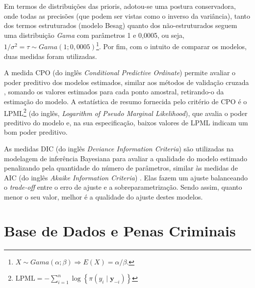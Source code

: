 \documentclass[12pt,openright,oneside,a4paper,english,french,spanish]{abntex2}
\numberwithin{table}{section} %
\numberwithin{figure}{section} %
\begin{document}
Em termos de distribuições das prioris, adotou-se uma postura conservadora, onde todas as precisões (que podem ser vistas como o inverso da variância), tanto dos termos estruturados (modelo Besag) quanto dos não-estruturados seguem uma distribuição \textit{Gama} com parâmetros 1 e 0,0005, ou seja, $1/\sigma ^{2}=\tau \sim Gama(1;0,0005)$\footnote{$X \sim Gama(\alpha;\beta) \Rightarrow E(X)=\alpha/\beta$.}. Por fim, com o intuito de comparar os modelos, duas medidas foram utilizadas.

A medida CPO (do inglês \textit{Conditional Predictive Ordinate}) \cite{spiegelhalter2002} permite avaliar o poder preditivo dos modelos estimados, similar aos métodos de validação cruzada \cite{kohavi1995}, somando os valores estimados para cada ponto amostral, retirando-o da estimação do modelo. A estatística de resumo fornecida pelo critério de CPO é o LPML\footnote{$\mbox{LPML}=-\sum_{i=1}^{n}\log\left\{ \pi\left(y_{i}\mid\boldsymbol{y}_{-i}\right)\right\}$} (do inglês, \textit{Logarithm of Pseudo Marginal Likelihood}), que avalia o poder preditivo do modelo e, na sua especificação, baixos valores de LPML indicam um bom poder preditivo.

As medidas DIC (do inglês \textit{Deviance Information Criteria}) \cite{gelfandBS1992,deyBio1997} são utilizadas na modelagem de inferência Bayesiana para avaliar a qualidade do modelo estimado penalizando pela quantidade do número de parâmetros, similar às medidas de AIC (do inglês \textit{Akaike Information Criteria}) \cite{akaike1973}. Elas fazem um ajuste balanceando o \textit{trade-off} entre o erro de ajuste e a sobreparametrização. Sendo assim, quanto menor o seu valor, melhor é a qualidade do ajuste destes modelos.


\section{Base de Dados e Penas Criminais\label{subsec:Base_Penas_Indice}}
\end{document}
